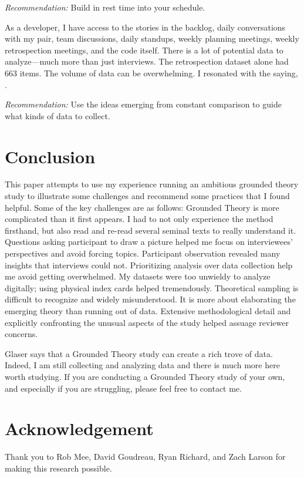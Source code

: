\textit{Recommendation:} Build in rest time into your schedule.

As a developer, I have access to the stories in the backlog, daily conversations with my pair, team discussions, daily standups, weekly planning meetings, weekly retrospection meetings,  and the code itself. There is a lot of potential data to analyze---much more than just interviews. The retrospection dataset alone had 663 items. The volume of data can be overwhelming. I resonated with the saying,  \cite{Charmaz}. 

\textit{Recommendation:} Use the ideas emerging from constant comparison to guide what kinds of data to collect. 
\section{Conclusion}
\label{Conclusion}
This paper attempts to use my experience running an ambitious grounded theory study to illustrate some challenges and recommend some practices that I found helpful. Some of the key challenges are as follows:
Grounded Theory is more complicated than it first appears. I had to not only experience the method firsthand, but also read and re-read several seminal texts to really understand it.
Questions asking participant to draw a picture helped me focus on interviewees' perspectives and avoid forcing topics. 
Participant observation revealed many insights that interviews could not. 
Prioritizing analysis over data collection help me avoid getting overwhelmed.
My datasets were too unwieldy to analyze digitally; using physical index cards helped tremendously. 
Theoretical sampling is difficult to recognize and widely misunderstood. It is more about elaborating the emerging theory than running out of data. 
Extensive methodological detail and explicitly confronting the unusual aspects of the study helped assuage reviewer concerns. 

Glaser says that a Grounded Theory study can create a rich trove of data. Indeed, I am still collecting and analyzing data and there is much more here worth studying. If you are conducting a Grounded Theory study of your own, and especially if you are struggling, please feel free to contact me.

\section*{Acknowledgement}
Thank you to Rob Mee, David Goudreau, Ryan Richard, and Zach Larson for making this research possible.



